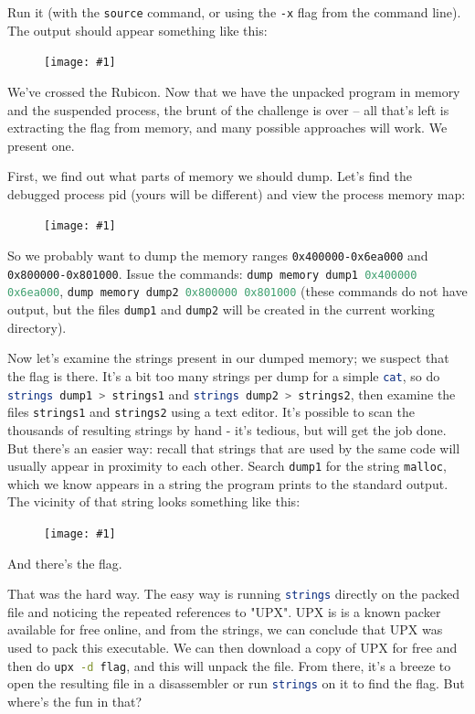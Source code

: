 \documentclass{article}
\newcommand{\displayimage}[1] {
\begin{figure}[H]
    \centering
    \texttt{[image: \#1]} 
\end{figure}
}
\newcommand{\xcode}[2]{\colorbox{ubuntuback}{\lstinline[language=#1]|#2|}}
\newcommand{\code}[1]{\colorbox{ubuntuback}{\texttt{#1}}}
\newcommand{\gdb}[1]{\xcode{C}{#1}}
\begin{document}
Run it (with the \gdb{source} command, or using the \xcode{bash}{-x} flag from the command line). The output should appear something like this:

\displayimage{./exercises/03_flag/unpacked_code.png}

We've crossed the Rubicon. Now that we have the unpacked program in memory and the suspended process, the brunt of the challenge is over -- all that's left is extracting the flag from memory, and many possible approaches will work. We present one.

First, we find out what parts of memory we should dump. Let's find the debugged process pid (yours will be different) and view the process memory map:

\displayimage{./exercises/03_flag/memory_map.png}

So we probably want to dump the memory ranges \code{0x400000-0x6ea000} and \code{0x800000-0x801000}. Issue the commands: \gdb{dump memory dump1 0x400000 0x6ea000}, \gdb{dump memory dump2 0x800000 0x801000} (these commands do not have output, but the files \xcode{bash}{dump1} and \xcode{bash}{dump2} will be created in the current working directory).

Now let's examine the strings present in our dumped memory; we suspect that the flag is there. It's a bit too many strings per dump for a simple \xcode{bash}{cat}, so do \xcode{bash}{strings dump1 > strings1} and \xcode{bash}{strings dump2 > strings2}, then examine the files \code{strings1} and \code{strings2} using a text editor. It's possible to scan the thousands of resulting strings by hand - it's tedious, but will get the job done. But there's an easier way: recall that strings that are used by the same code will usually appear in proximity to each other. Search \code{dump1} for the string \code{malloc}, which we know appears in a string the program prints to the standard output. The vicinity of that string looks something like this:

\displayimage{./exercises/03_flag/bingo.png}

And there's the flag.

That was the hard way. The easy way is running \xcode{bash}{strings} directly on the packed file and noticing the repeated references to "UPX". UPX is is a known packer available for free online, and from the strings, we can conclude that UPX was used to pack this executable. We can then download a copy of UPX for free and then do \xcode{bash}{upx -d flag}, and this will unpack the file. From there, it's a breeze to open the resulting file in a disassembler or run \xcode{bash}{strings} on it to find the flag. But where's the fun in that?
\end{document}
